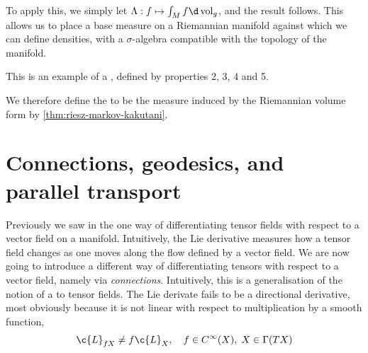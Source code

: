 To apply this, we simply let \(\Lambda: f \mapsto \int_M f \d\vol_g\), and the result follows.
This allows us to place a base measure on a Riemannian manifold against which we can define densities, with a \(\sigma\)-algebra compatible with the topology of the manifold.

This is an example of a , defined by properties 2, 3, 4 and 5.

We therefore define the  to be the measure induced by the Riemannian volume form by \cref{thm:riesz-markov-kakutani}.

\section{Connections, geodesics, and parallel transport}
\label{sec:connections}
Previously we saw in the  one way of differentiating tensor fields with respect to a vector field on a manifold.
Intuitively, the Lie derivative measures how a tensor field changes as one moves along the flow defined by a vector field.
We are now going to introduce a different way of differentiating tensors with respect to a vector field, namely via \emph{connections}.
Intuitively, this is a generalisation of the notion of a  to tensor fields. 
The Lie derivate fails to be a directional derivative, most obviously because it is not linear with respect to multiplication by a smooth function,
\[
	\c{L}_{f X} \neq f \c{L}_X, \quad f\in C^\infty(X), \; X\in \Gamma(TX)	
\]

